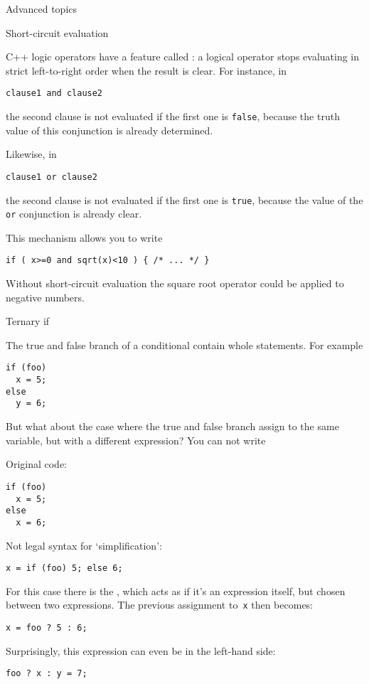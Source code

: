  {Advanced topics}

 {Short-circuit evaluation}

C++ logic operators have a feature called
:
a logical operator stops evaluating
in strict left-to-right order
when the result is clear.
For instance, in
\begin{lstlisting}
clause1 and clause2
\end{lstlisting}
the second clause is not evaluated if the first one is
\lstinline{false}, because the truth value of this conjunction is
already determined.

Likewise, in
\begin{lstlisting}
clause1 or clause2
\end{lstlisting}
the second clause is not evaluated if the first one is \lstinline{true},
because the value of the \lstinline{or} conjunction is already clear.

This mechanism allows you to write
\begin{lstlisting}
if ( x>=0 and sqrt(x)<10 ) { /* ... */ }
\end{lstlisting}
Without short-circuit evaluation the square root operator could be applied to
negative numbers.

 {Ternary if}

The true and false branch of a conditional contain whole statements.
For example
\begin{lstlisting}
if (foo)
  x = 5;
else
  y = 6;
\end{lstlisting}
But what about the case where the true and false branch
assign to the same variable, but with a different expression?
You can not write
\begin{multicols}{2}
Original code:
\begin{lstlisting}
if (foo)
  x = 5;
else
  x = 6;
\end{lstlisting}
\columnbreak
Not legal syntax for `simplification':
\begin{lstlisting}
x = if (foo) 5; else 6; 
\end{lstlisting}
\end{multicols}
For this case there is the ,
which acts as if it's an expression itself, but chosen
between two expressions.
The previous assignment to~\lstinline{x} then becomes:
\begin{lstlisting}
x = foo ? 5 : 6;
\end{lstlisting}
Surprisingly, this expression can even be in the left-hand side:
\begin{lstlisting}
foo ? x : y = 7;
\end{lstlisting}

